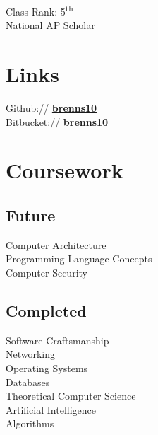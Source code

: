 \documentclass[letterpaper]{deedy-resume} %
\begin{document}
\begin{minipage}[t]{0.33\textwidth}
Class Rank: 5\textsuperscript{th} \\
National AP Scholar \\

\sectionspace %


\section{Links}

Github:// \href{https://github.com/brenns10}{\bf brenns10} \\
Bitbucket:// \href{https://bitbucket.org/brenns10}{\bf brenns10} \\

\sectionspace %


\section{Coursework}

\subsection{Future}

Computer Architecture \\
Programming Language Concepts \\
Computer Security

\sectionspace %


\subsection{Completed}

Software Craftsmanship \\
Networking \\
Operating Systems \\
Databases \\
Theoretical Computer Science \\
Artificial Intelligence \\
Algorithms



\end{minipage}
\end{document}
